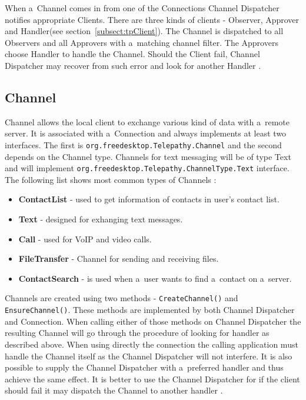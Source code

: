 When a~Channel comes in from one of the Connections Channel Dispatcher notifies appropriate Clients. There are three kinds of clients - Observer, Approver and Handler(see section~\ref{subsect:tpClient}). The Channel is dispatched to all Observers and all Approvers with a~matching channel filter. The Approvers choose Handler to handle the Channel. Should the Client fail, Channel Dispatcher may recover from such error and look for another Handler \cite{TPWiki}.


\subsection*{Channel}
Channel allows the local client to exchange various kind of data with a~remote server. It is associated with a~Connection and always implements at least two interfaces. The first is \verb|org.freedesktop.Telepathy.Channel| and the second depends on the Channel type. Channels for text messaging will be of type Text and will implement \newline \verb|org.freedesktop.Telepathy.ChannelType.Text| interface. The following list shows most common types of Channels \cite{TPWiki}:

\begin{itemize}

	\item {\bf ContactList} - used to get information of contacts in user's contact list.

	\item {\bf Text} - designed for exhanging text messages. 

	\item {\bf Call} - used for VoIP and video calls. 

	\item {\bf FileTransfer} - Channel for sending and receiving files.

	\item {\bf ContactSearch} - is used when a~user wants to find a~contact on a~server.

\end{itemize}

Channels are created using two methods - \verb|CreateChannel()| and \verb|EnsureChannel()|. These methods are implemented by both Channel Dispatcher and Connection. When calling either of those methods on Channel Dispatcher the resulting Channel will go through the procedure of looking for handler as described above. When using directly the connection the calling application must handle the Channel itself as the Channel Dispatcher will not interfere. It is also possible to supply the Channel Dispatcher with a~preferred handler and thus achieve the same effect. It is better to use the Channel Dispatcher for if the client should fail it may dispatch the Channel to another handler \cite{TPWiki}.

